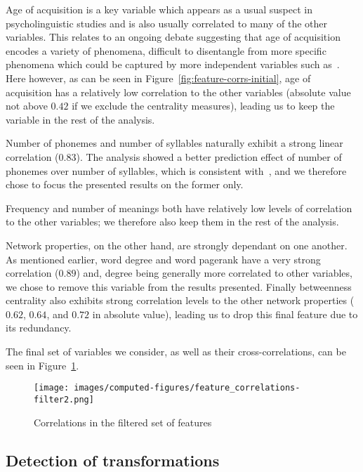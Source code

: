 Age of acquisition is a key variable which appears as a usual suspect in psycholinguistic studies and is also usually correlated to many of the other variables.
This relates to an ongoing debate suggesting that age of acquisition encodes a variety of phenomena, difficult to disentangle from more specific phenomena which could be captured by more independent variables such as~\CN{}.
Here however, as can be seen in Figure~\ref{fig:feature-corrs-initial}, age of acquisition has a relatively low correlation to the other variables (absolute value not above $0.42$ if we exclude the centrality measures), leading us to keep the variable in the rest of the analysis.

Number of phonemes and number of syllables naturally exhibit a strong linear correlation ($0.83$).
The analysis showed a better prediction effect of number of phonemes over number of syllables, which is consistent with~\citet{nick-diss}, and we therefore chose to focus the presented results on the former only.

Frequency and number of meanings both have relatively low levels of correlation to the other variables; we therefore also keep them in the rest of the analysis.

\bigskip
Network properties, on the other hand, are strongly dependant on one another.
As mentioned earlier, word degree and word pagerank have a very strong correlation ($0.89$) and, degree being generally more correlated to other variables, we chose to remove this variable from the results presented.
Finally betweenness centrality also exhibits strong correlation levels to the other network properties ($0.62$, $0.64$, and $0.72$ in absolute value), leading us to drop this final feature due to its redundancy.

The final set of variables we consider, as well as their cross-correlations, can be seen in Figure~\ref{fig:feature-corrs-filtered}.

\begin{figure}[!th]
    \centering
    \texttt{[image: images/computed-figures/feature\_correlations-filter2.png]}
    \caption{Correlations in the filtered set of features }
    \label{fig:feature-corrs-filtered}
\end{figure}


\subsection{Detection of transformations}

